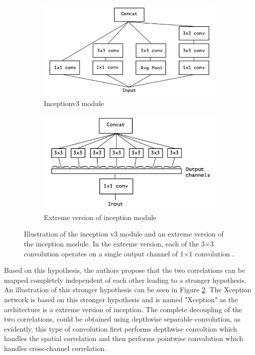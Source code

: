 	\begin{figure}
		\begin{subfigure}{.5\textwidth}
			\centering
			\includegraphics[width=1\linewidth]{images/inception_v3}
			\caption{Inceptionv3 module}
			\label{Fig:xceptiona}
		\end{subfigure}
		\begin{subfigure}{.5\textwidth}
			\centering
			\includegraphics[width=1\linewidth]{images/extreme_inception}
			\caption{Extreme version of inception module}
			\label{Fig:xceptionb}
		\end{subfigure}
		\caption{Illustration of the inception v3 module and an extreme version of the inception module. In the extreme version, each of the 3$\times$3 convolution operates on a single output channel of 1$\times$1 convolution \cite{DBLP:journals/corr/Chollet16a}.}
		\label{Fig:xception}
	\end{figure}

Based on this hypothesis, the authors propose that the two correlations can be mapped completely independent of each other leading to a stronger hypothesis. An illustration of this stronger hypothesis can be seen in Figure \ref{Fig:xceptionb}. The Xception network is based on this stronger hypothesis and is named "Xception" as the architecture is a extreme version of inception. The complete decoupling of the two correlations, could be obtained using depthwise separable convolution, as evidently, this type of convolution first performs depthwise convoltion which handles the spatial correlation and then performs pointwise convolution which handles cross-channel correlation.

